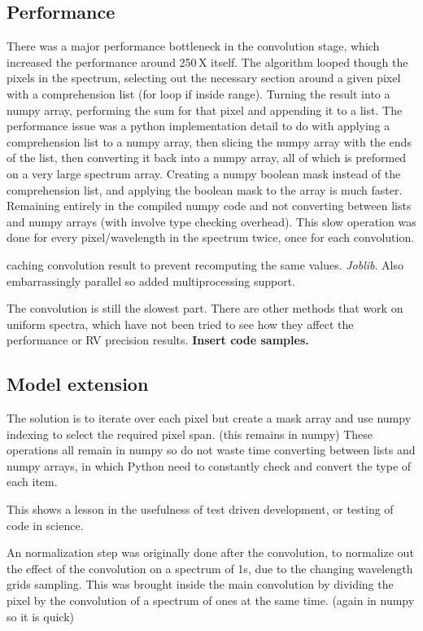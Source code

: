 \subsection{Performance}
\label{subsection:code_performance}
There was a major performance bottleneck in the convolution stage, which increased the performance around 250\,X itself.
The algorithm looped though the pixels in the spectrum, selecting out the necessary section around a given pixel with a comprehension list (for loop if inside range).
Turning the result into a numpy array, performing the sum for that pixel and appending it to a list.
The performance issue was a python implementation detail to do with applying a comprehension list to a numpy array, then slicing the numpy array with the ends of the list, then converting it back into a numpy array, all of which is preformed on a very large spectrum array.
Creating a numpy boolean mask instead of the comprehension list, and applying the boolean mask to the array is much faster.
Remaining entirely in the compiled numpy code and not converting between lists and numpy arrays (with involve type checking overhead).
This slow operation was done for every pixel/wavelength in the spectrum twice, once for each convolution.

caching convolution result to prevent recomputing the same values. \emph{Joblib}.  Also embarrassingly parallel so added multiprocessing support.

The convolution is still the slowest part.
There are other methods that work on uniform spectra, which have not been tried to see how they affect the performance or {RV} precision results.
\textbf{Insert code samples.}


\subsection{Model extension}
The solution is to iterate over each pixel but create a mask array and use numpy indexing to select the required pixel span. (this remains in numpy)
These operations all remain in numpy so do not waste time converting between lists and numpy arrays, in which Python need to constantly check and convert the type of each item.

This shows a lesson in the usefulness of test driven development, or testing of code in science.


An normalization step was originally done after the convolution, to normalize out the effect of the convolution on a spectrum of 1s, due to the changing wavelength grids sampling.
This was brought inside the main convolution by dividing the pixel by the convolution of a spectrum of ones at the same time. (again in numpy so it is quick)

